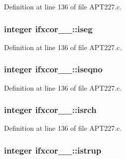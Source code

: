 Definition at line 136 of file A\+P\+T227.\+c.

\subsubsection[{\texorpdfstring{iseg}{iseg}}]{\setlength{\rightskip}{0pt plus 5cm}integer ifxcor\+\_\+\_\+\+::iseg}\hypertarget{structifxcor__1___aced7e35e68f94176c8722e71cc133e8f}{}\label{structifxcor__1___aced7e35e68f94176c8722e71cc133e8f}


Definition at line 136 of file A\+P\+T227.\+c.

\subsubsection[{\texorpdfstring{iseqno}{iseqno}}]{\setlength{\rightskip}{0pt plus 5cm}integer ifxcor\+\_\+\_\+\+::iseqno}\hypertarget{structifxcor__1___a90efcda0687c5bf427941f7ca6d141cb}{}\label{structifxcor__1___a90efcda0687c5bf427941f7ca6d141cb}


Definition at line 136 of file A\+P\+T227.\+c.

\subsubsection[{\texorpdfstring{isrch}{isrch}}]{\setlength{\rightskip}{0pt plus 5cm}integer ifxcor\+\_\+\_\+\+::isrch}\hypertarget{structifxcor__1___a0f049d4956971397b2cfacff46191935}{}\label{structifxcor__1___a0f049d4956971397b2cfacff46191935}


Definition at line 136 of file A\+P\+T227.\+c.

\subsubsection[{\texorpdfstring{istrup}{istrup}}]{\setlength{\rightskip}{0pt plus 5cm}integer ifxcor\+\_\+\_\+\+::istrup}\hypertarget{structifxcor__1___a34c29d8296d9a1d9eb4e0fb424b55cee}{}\label{structifxcor__1___a34c29d8296d9a1d9eb4e0fb424b55cee}


